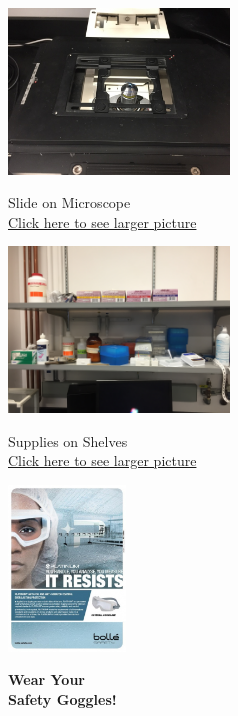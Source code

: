 \documentclass{../lab}
\begin{document}
\begin{figure}[H]
\captionsetup{justification=centering}
  \href{http://experimentationlab.berkeley.edu/sites/default/files/upimages/Slide-on-Microscope_2544.JPG}{\includegraphics[height=125pt,keepaspectratio]{images/Slide-on-Microscope_2544.JPG}}
  \caption{Slide on Microscope\\ \href{http://experimentationlab.berkeley.edu/sites/default/files/upimages/Slide-on-Microscope_2544.JPG}{Click here to see larger picture}}
  \label{fig:MicroscopeSlide}
\endminipage \hfill
{}
  \href{http://experimentationlab.berkeley.edu/sites/default/files/upimages/BMC\%20Supplies\%20on\%20Shelves_2541.JPG}{\includegraphics[height=125pt,keepaspectratio]{images/IMG_2541.JPG}}
  \caption{Supplies on Shelves \\ \href{http://experimentationlab.berkeley.edu/sites/default/files/upimages/BMC\%20Supplies\%20on\%20Shelves_2541.JPG}{Click here to see larger picture}}
  \label{fig:Supplies}
\endminipage \hfill
{}
\centering
  \href{http://experimentationlab.berkeley.edu/sites/default/files/upimages/3_eye-wear-face.jpg}{\includegraphics[height=125pt]{images/3_eye-wear-face.jpg}}
    \caption{\textbf{Wear Your \\ Safety Goggles!}}
    \label{fig:SafetyGoggle}
    \endminipage
\end{figure}
\end{document}
